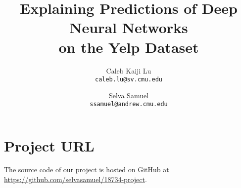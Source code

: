 \documentclass[11pt, twocolumn]{article}
\title{Explaining Predictions of Deep Neural Networks \\ on the Yelp Dataset}
\author{
	Caleb Kaiji Lu \\
	{\tt caleb.lu@sv.cmu.edu}
	\and
	Selva Samuel \\
	{\tt ssamuel@andrew.cmu.edu}
}
\date{}
\begin{document}
\maketitle













\section{Project URL}

The source code of our project is hosted on GitHub at \url{https://github.com/selvasamuel/18734-project}.



\nocite{Lu2017}
\nocite{Sundararajan2017}
\nocite{ZarembaSV2014}
\nocite{Burger2011}
\nocite{Datta2017}
\nocite{Mukherjee2010}
\nocite{Ribeiro2016}
\nocite{Tang2015}
\nocite{Yelp2017}



\end{document}
